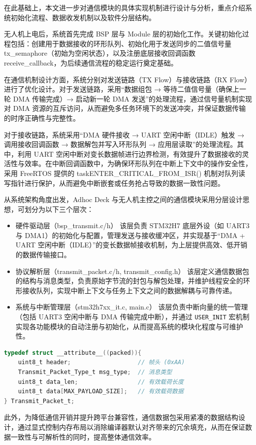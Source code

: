 在此基础上，本文进一步对通信模块的具体实现机制进行设计与分析，重点介绍系统初始化流程、数据收发机制以及软件分层结构。

无人机上电后，系统首先完成 BSP 层与 Module 层的初始化工作。关键初始化过程包括：创建用于数据接收的环形队列、初始化用于发送同步的二值信号量 tx\_semaphore（初始为空闲状态），以及注册底层接收回调函数 receive\_callback，为后续通信流程的稳定运行奠定基础。

在通信机制设计方面，系统分别对发送链路（TX Flow）与接收链路（RX Flow）进行了优化设计。对于发送链路，采用“数据组包 → 等待二值信号量（确保上一轮 DMA 传输完成）→ 启动新一轮 DMA 发送”的处理流程，通过信号量机制实现对 DMA 资源的互斥访问，从而避免多任务环境下的发送冲突，并保证数据传输的时序正确性与完整性。

对于接收链路，系统采用“DMA 硬件接收 → UART 空闲中断（IDLE）触发 → 调用接收回调函数 → 数据解包并写入环形队列 → 应用层读取”的处理流程。其中，利用 UART 空闲中断对变长数据帧进行边界检测，有效提升了数据接收的灵活性与效率。在中断回调函数中，为确保环形队列在中断上下文中的操作安全性，采用 FreeRTOS 提供的 taskENTER\_CRITICAL\_FROM\_ISR() 机制对队列读写指针进行保护，从而避免中断嵌套或任务抢占导致的数据一致性问题。

从系统架构角度出发，Adhoc Deck 与无人机主控之间的通信模块采用分层设计思想，可划分为以下三个层次：


\begin{itemize}
    \item 硬件驱动层（bsp\_transmit.c/h）
    该层负责 STM32H7 底层外设（如 UART3 与 DMA1）的初始化与配置，管理发送与接收缓冲区，并实现基于“DMA + UART 空闲中断（IDLE）”的变长数据帧接收机制，为上层提供高效、低开销的数据传输接口。

    \item 协议解析层（transmit\_packet.c/h, transmit\_config.h）
    该层定义通信数据包的结构与消息类型，负责原始字节流的封包与解包处理，并维护线程安全的环形接收队列，实现中断上下文与任务上下文之间的数据解耦与可靠传递。

    \item 系统与中断管理层（stm32h7xx\_it.c, main.c）  
    该层负责中断向量的统一管理（包括 UART3 空闲中断与 DMA 传输完成中断），并通过 \texttt{USER\_INIT} 宏机制实现各功能模块的自动注册与初始化，从而提高系统的模块化程度与可维护性。
\end{itemize}

\begin{lstlisting}[language=C, caption={通信数据包结构定义}]
typedef struct __attribute__((packed)){
    uint8_t header;                   // 帧头 (0xAA)
    Transmit_Packet_Type_t msg_type;  // 消息类型
    uint8_t data_len;                 // 有效载荷长度
    uint8_t data[MAX_PAYLOAD_SIZE];   // 有效载荷数据
} Transmit_Packet_t;
\end{lstlisting}
此外，为降低通信开销并提升跨平台兼容性，通信数据包采用紧凑的数据结构设计，通过显式控制内存布局以消除编译器默认对齐带来的冗余填充，从而在保证数据一致性与可解析性的同时，提高整体通信效率。


